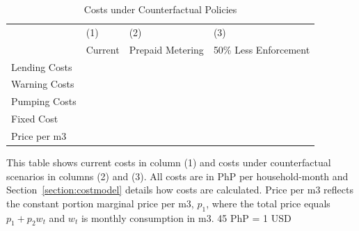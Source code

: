 \documentclass[12pt,table]{article}
\begin{document}
\begin{table}[H]
\centering
\caption{Costs under Counterfactual Policies}\label{table:countercosts}
\begin{threeparttable}
\begin{tabular}{@{}l*{1}{EEE}@{}}
\toprule
 & (1)    & (2)          & (3)   \\
 & Current & Prepaid Metering & 50\% Less Enforcement   \\
\midrule
Lending Costs  &   &   &   \\
Warning Costs &  &     &     \\
Pumping Costs  &    &     &     \\
Fixed Cost &    &       &     \\
Price per m3  &   &     &    \\
\bottomrule
\end{tabular}
\begin{tablenotes}
\item 
\footnotesize 
 This table shows current costs in column (1) and costs under counterfactual scenarios in columns (2) and (3).  All costs are in PhP per household-month and Section~\ref{section:costmodel} details how costs are calculated.  Price per m3 reflects the constant portion marginal price per m3, $p_1$, where the total price equals $p_1+p_2 w_t$ and $w_t$ is monthly consumption in m3.  45 PhP = 1 USD
\end{tablenotes}
\end{threeparttable}
\end{table}
\end{document}
